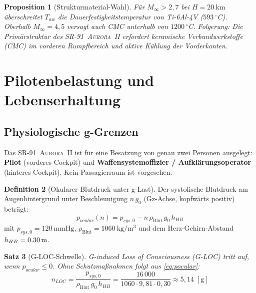 ﻿\documentclass[12pt,a4paper]{article}
\theoremstyle{plain}
\newtheorem{theorem}{Satz}[section]
\newtheorem{proposition}[theorem]{Proposition}
\theoremstyle{definition}
\newtheorem{definition}[theorem]{Definition}
\theoremstyle{remark}
\newcommand{\SR}{\textsc{SR-91~Aurora~II}}
\begin{document}
\begin{proposition}[Strukturmaterial-Wahl]
  Für $M_\infty > 2{,}7$ bei $H = \SI{20}{\kilo\metre}$ überschreitet $T_{aw}$
  die Dauerfestigkeitstemperatur von Ti-6Al-4V ($593\,{}^\circ$C). Oberhalb
  $M_\infty = 4{,}5$ versagt auch CMC unterhalb von $1200\,{}^\circ$C.
  Folgerung: Die Primärstruktur des \SR{} erfordert keramische Verbundwerkstoffe
  (CMC) im vorderen Rumpfbereich und aktive Kühlung der Vorderkanten.
\end{proposition}

\section{Pilotenbelastung und Lebenserhaltung}
\label{sec:pilot}

\subsection{Physiologische g-Grenzen}

Das \SR{} ist für eine Besatzung von genau zwei Personen ausgelegt:
\textbf{Pilot} (vorderes Cockpit) und \textbf{Waffensystemoffizier / Aufklärungsoperator}
(hinteres Cockpit). Kein Passagierraum ist vorgesehen.

\begin{definition}[Okularer Blutdruck unter g-Last]
  Der systolische Blutdruck am Augenhintergrund unter Beschleunigung $n\,g_0$
  (Gz-Achse, kopfwärts positiv) beträgt:
  \begin{equation}
    p_{ocular}(n) = p_{sys,0} - n\,\rho_{\text{Blut}}\,g_0\,h_{HB}
    \label{eq:pocular}
  \end{equation}
  mit $p_{sys,0} = \SI{120}{\mmHg}$, $\rho_{\text{Blut}} = \SI{1060}{\kilo\gram\per\cubic\metre}$
  und dem Herz-Gehirn-Abstand $h_{HB} = \SI{0{,}30}{\metre}$.
\end{definition}

\begin{theorem}[G-LOC-Schwelle]
  \label{thm:gloc}
  G-induced Loss of Consciousness (G-LOC) tritt auf, wenn $p_{ocular} \leq 0$.
  Ohne Schutzmaßnahmen folgt aus \cref{eq:pocular}:
  \begin{equation}
    n_{LOC} = \frac{p_{sys,0}}{\rho_{\text{Blut}}\,g_0\,h_{HB}}
    = \frac{16\,000}{1060 \cdot 9{,}81 \cdot 0{,}30}
    \approx 5{,}14\;[\text{g}]
    \label{eq:nloc}
  \end{equation}
\end{theorem}
\end{document}
